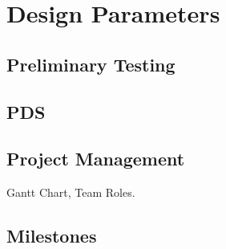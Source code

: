 \section{Design Parameters}
\label{sec:design_parameters}

\subsection{Preliminary Testing}
\label{sub:preliminary_testing}


\subsection{PDS}
\label{sub:pds}


\subsection{Project Management}
\label{sub:project_management}

Gantt Chart, Team Roles.


\subsection{Milestones}
\label{sub:milestones}

